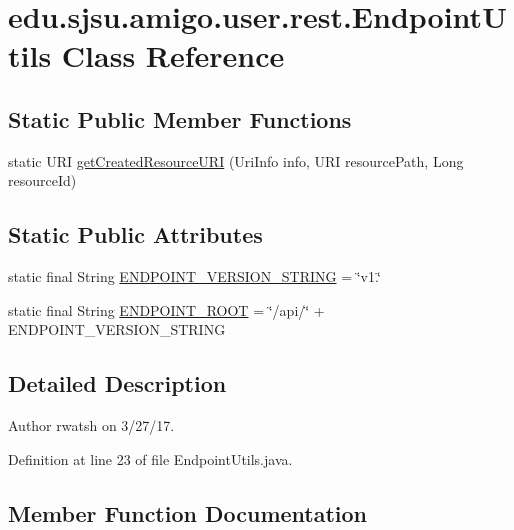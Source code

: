 \hypertarget{classedu_1_1sjsu_1_1amigo_1_1user_1_1rest_1_1_endpoint_utils}{}\section{edu.\+sjsu.\+amigo.\+user.\+rest.\+Endpoint\+Utils Class Reference}
\label{classedu_1_1sjsu_1_1amigo_1_1user_1_1rest_1_1_endpoint_utils}
\subsection*{Static Public Member Functions}
\begin{DoxyCompactItemize}
\item 
static U\+RI \hyperlink{classedu_1_1sjsu_1_1amigo_1_1user_1_1rest_1_1_endpoint_utils_a8fc2750698f9833a4de115720b32f385}{get\+Created\+Resource\+U\+RI} (Uri\+Info info, U\+RI resource\+Path, Long resource\+Id)
\end{DoxyCompactItemize}
\subsection*{Static Public Attributes}
\begin{DoxyCompactItemize}
\item 
static final String \hyperlink{classedu_1_1sjsu_1_1amigo_1_1user_1_1rest_1_1_endpoint_utils_a13897e535cc5fc4a550ee1e00d2c1158}{E\+N\+D\+P\+O\+I\+N\+T\+\_\+\+V\+E\+R\+S\+I\+O\+N\+\_\+\+S\+T\+R\+I\+NG} = \char`\"{}v1.\char`\"{}
\item 
static final String \hyperlink{classedu_1_1sjsu_1_1amigo_1_1user_1_1rest_1_1_endpoint_utils_ac0c00a17daf74b52ad1156b484e554e0}{E\+N\+D\+P\+O\+I\+N\+T\+\_\+\+R\+O\+OT} = \char`\"{}/api/\char`\"{} + E\+N\+D\+P\+O\+I\+N\+T\+\_\+\+V\+E\+R\+S\+I\+O\+N\+\_\+\+S\+T\+R\+I\+NG
\end{DoxyCompactItemize}


\subsection{Detailed Description}
\begin{DoxyAuthor}{Author}
rwatsh on 3/27/17. 
\end{DoxyAuthor}


Definition at line 23 of file Endpoint\+Utils.\+java.



\subsection{Member Function Documentation}
\mbox{\label{classedu_1_1sjsu_1_1amigo_1_1user_1_1rest_1_1_endpoint_utils_a8fc2750698f9833a4de115720b32f385}} 

